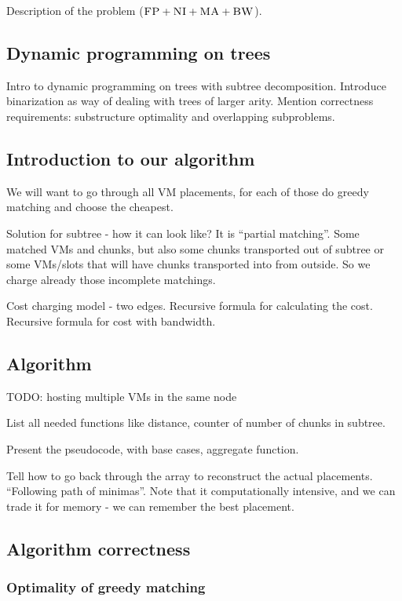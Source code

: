 Description of the problem ($\textsc{FP}+\textsc{NI}+\textsc{MA}+\textsc{BW}$).

\subsection{Dynamic programming on trees}

Intro to dynamic programming on trees with subtree decomposition.
Introduce binarization as way of dealing with trees of larger arity.
Mention correctness requirements: substructure optimality and overlapping subproblems.

\subsection{Introduction to our algorithm}

We will want to go through all VM placements, for each of those do greedy matching and choose the cheapest.

Solution for subtree - how it can look like? It is ``partial matching''. Some matched VMs and chunks, but also some chunks transported out of subtree or some VMs/slots that will have chunks transported into from outside. So we charge already those incomplete matchings.

Cost charging model - two edges. Recursive formula for calculating the cost.
Recursive formula for cost with bandwidth. 

\subsection{Algorithm}

TODO: hosting multiple VMs in the same node

List all needed functions like distance, counter of number of chunks in subtree.

Present the pseudocode, with base cases, aggregate function.

Tell how to go back through the array to reconstruct the actual placements. ``Following path of minimas''.
Note that it computationally intensive, and we can trade it for memory - we can remember the best placement.

\subsection{Algorithm correctness}
\subsubsection{Optimality of greedy matching}

